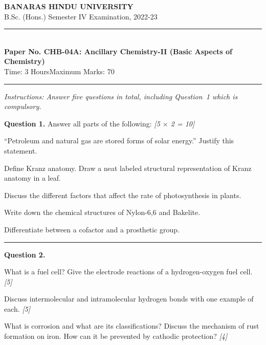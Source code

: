 \documentclass[11pt,a4paper]{article}
\newcommand{\pts}[1]{\hfill   \textit{[#1]}}
\begin{document}
\begin{center}
  {\large\bfseries BANARAS HINDU UNIVERSITY}\\[2pt]
  {\normalsize B.Sc. (Hons.) Semester IV Examination, 2022-23}\\[6pt]
  \rule{0.8\linewidth}{0.5pt}\\[6pt]
  {\large\bfseries Paper No. CHB-04A: Ancillary Chemistry-II (Basic Aspects of Chemistry)}\\[4pt]
  {\normalsize Time: 3 Hours\hfill Maximum Marks: 70}
\end{center}
\rule{\linewidth}{0.4pt}
\small



\noindent   \textit{Instructions: Answer five questions in total, including Question~1 which is compulsory.}

\normalsize
\bigskip




\noindent   \textbf{Question 1.} Answer all parts of the following: \pts{5 $ \times$ 2 = 10}

\begin{parts}
  \item ``Petroleum and natural gas are stored forms of solar energy.'' Justify this statement.
  \item Define Kranz anatomy. Draw a neat labeled structural representation of Kranz anatomy in a leaf.
  \item Discuss the different factors that affect the rate of photosynthesis in plants.
  \item Write down the chemical structures of Nylon-6,6 and Bakelite.
  \item Differentiate between a cofactor and a prosthetic group.
\end{parts}

\medskip\rule{\linewidth}{0.2pt}




\noindent   \textbf{Question 2.}

\begin{parts}
  \item What is a fuel cell? Give the electrode reactions of a hydrogen-oxygen fuel cell. \pts{5}
  \item Discuss intermolecular and intramolecular hydrogen bonds with one example of each. \pts{5}
  \item What is corrosion and what are its classifications? Discuss the mechanism of rust formation on iron. How can it be prevented by cathodic protection? \pts{4}
\end{parts}
\end{document}
